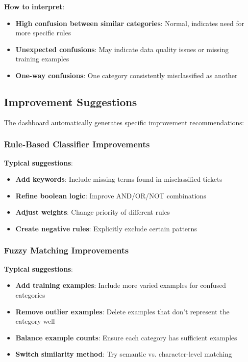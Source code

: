\documentclass[11pt,a4paper]{article}
\begin{document}
\textbf{How to interpret}:
\begin{itemize}
    \item \textbf{High confusion between similar categories}: Normal, indicates need for more specific rules
    \item \textbf{Unexpected confusions}: May indicate data quality issues or missing training examples
    \item \textbf{One-way confusions}: One category consistently misclassified as another
\end{itemize}

\subsection{Improvement Suggestions}

The dashboard automatically generates specific improvement recommendations:

\subsubsection{Rule-Based Classifier Improvements}
\textbf{Typical suggestions}:
\begin{itemize}
    \item \textbf{Add keywords}: Include missing terms found in misclassified tickets
    \item \textbf{Refine boolean logic}: Improve AND/OR/NOT combinations
    \item \textbf{Adjust weights}: Change priority of different rules
    \item \textbf{Create negative rules}: Explicitly exclude certain patterns
\end{itemize}

\subsubsection{Fuzzy Matching Improvements}
\textbf{Typical suggestions}:
\begin{itemize}
    \item \textbf{Add training examples}: Include more varied examples for confused categories
    \item \textbf{Remove outlier examples}: Delete examples that don't represent the category well
    \item \textbf{Balance example counts}: Ensure each category has sufficient examples
    \item \textbf{Switch similarity method}: Try semantic vs. character-level matching
\end{itemize}
\end{document}
